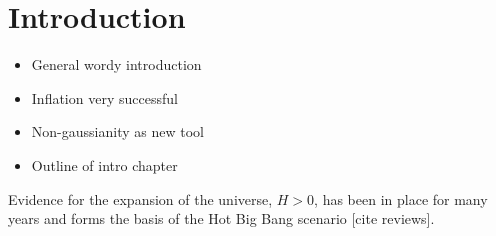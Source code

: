 \renewcommand{\CVSrevision}{\version$Id: mainintro.tex,v 1.27 2009/08/27 10:35:22 ith Exp $}

\chapter{Introduction}
\label{ch:introduction}
\begin{itemize}
 \item General wordy introduction
 \item Inflation very successful
 \item Non-gaussianity as new tool
 \item Outline of intro chapter
\end{itemize}

Evidence for the expansion of the universe, $H>0$, has been in place for many
years and forms the basis of the Hot Big Bang scenario [cite reviews]. 

